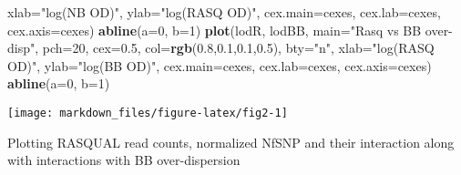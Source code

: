 \documentclass[]{article}
\newenvironment{Shaded}{\begin{snugshade}}{\end{snugshade}}
\newcommand{\KeywordTok}[1]{\textcolor[rgb]{0.13,0.29,0.53}{\textbf{#1}}}
\newcommand{\DataTypeTok}[1]{\textcolor[rgb]{0.13,0.29,0.53}{#1}}
\newcommand{\DecValTok}[1]{\textcolor[rgb]{0.00,0.00,0.81}{#1}}
\newcommand{\FloatTok}[1]{\textcolor[rgb]{0.00,0.00,0.81}{#1}}
\newcommand{\StringTok}[1]{\textcolor[rgb]{0.31,0.60,0.02}{#1}}
\newcommand{\NormalTok}[1]{#1}
\begin{document}
\begin{Shaded}
\begin{Highlighting}[]
     \DataTypeTok{xlab=}\StringTok{"log(NB OD)"}\NormalTok{, }\DataTypeTok{ylab=}\StringTok{"log(RASQ OD)"}\NormalTok{, }\DataTypeTok{cex.main=}\NormalTok{cexes, }\DataTypeTok{cex.lab=}\NormalTok{cexes, }\DataTypeTok{cex.axis=}\NormalTok{cexes)}
\KeywordTok{abline}\NormalTok{(}\DataTypeTok{a=}\DecValTok{0}\NormalTok{, }\DataTypeTok{b=}\DecValTok{1}\NormalTok{)}
\KeywordTok{plot}\NormalTok{(lodR, lodBB, }\DataTypeTok{main=}\StringTok{"Rasq vs BB over-disp"}\NormalTok{, }\DataTypeTok{pch=}\DecValTok{20}\NormalTok{, }\DataTypeTok{cex=}\FloatTok{0.5}\NormalTok{, }\DataTypeTok{col=}\KeywordTok{rgb}\NormalTok{(}\FloatTok{0.8}\NormalTok{,}\FloatTok{0.1}\NormalTok{,}\FloatTok{0.1}\NormalTok{,}\FloatTok{0.5}\NormalTok{), }\DataTypeTok{bty=}\StringTok{"n"}\NormalTok{,}
     \DataTypeTok{xlab=}\StringTok{"log(RASQ OD)"}\NormalTok{, }\DataTypeTok{ylab=}\StringTok{"log(BB OD)"}\NormalTok{, }\DataTypeTok{cex.main=}\NormalTok{cexes, }\DataTypeTok{cex.lab=}\NormalTok{cexes, }\DataTypeTok{cex.axis=}\NormalTok{cexes)}
\KeywordTok{abline}\NormalTok{(}\DataTypeTok{a=}\DecValTok{0}\NormalTok{, }\DataTypeTok{b=}\DecValTok{1}\NormalTok{)}
\end{Highlighting}
\end{Shaded}

\begin{center}\texttt{[image: markdown\_files/figure-latex/fig2-1]} \end{center}

Plotting RASQUAL read counts, normalized NfSNP and their interaction
along with interactions with BB over-dispersion
\end{document}
